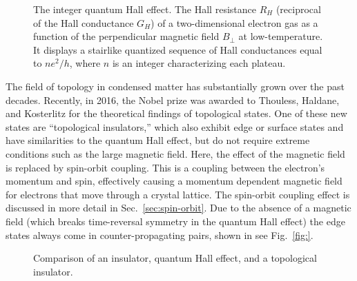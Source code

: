 \begin{figure}[!htb]
\centering
\caption{
The integer quantum Hall effect.
The Hall resistance $R_H$ (reciprocal of the Hall conductance $G_H$) of a two-dimensional electron gas as a function of the perpendicular magnetic field $B_\perp$ at low-temperature.
It displays a stairlike quantized sequence of Hall conductances equal to $ne^2/h$, where $n$ is an integer characterizing each plateau.
\label{fig:qhe}}
\end{figure}

The field of topology in condensed matter has substantially grown over the past decades.
Recently, in 2016, the Nobel prize was awarded to Thouless, Haldane, and Kosterlitz for the theoretical findings of topological states.
One of these new states are ``topological insulators,'' which also exhibit edge or surface states and have similarities to the quantum Hall effect, but do not require extreme conditions such as the large magnetic field.
Here, the effect of the magnetic field is replaced by spin-orbit coupling.
This is a coupling between the electron's momentum and spin, effectively causing a momentum dependent magnetic field for electrons that move through a crystal lattice.
The spin-orbit coupling effect is discussed in more detail in Sec.~\ref{sec:spin-orbit}.
Due to the absence of a magnetic field (which breaks time-reversal symmetry in the quantum Hall effect) the edge states always come in counter-propagating pairs, shown in see Fig.~\ref{fig:}.

\begin{figure}[!htb]
\centering
\caption{
Comparison of an insulator, quantum Hall effect, and a topological insulator.
\label{fig:qhe}}
\end{figure}

